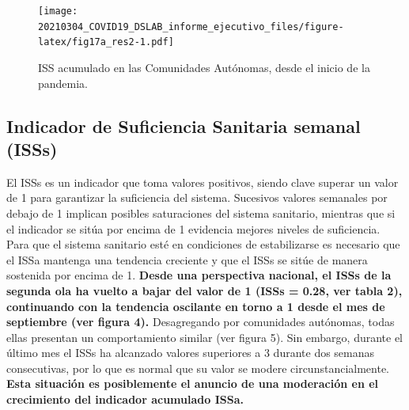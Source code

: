 \documentclass[
  11pt,
]{article}
\begin{document}
\vspace{0.2cm}

\begin{figure}
\centering
\texttt{[image: 20210304\_COVID19\_DSLAB\_informe\_ejecutivo\_files/figure-latex/fig17a\_res2-1.pdf]}
\caption{\label{fig:fig17a_res} ISS acumulado en las Comunidades
Autónomas, desde el inicio de la pandemia.}
\end{figure}

\newpage
\setcounter{page}{6}

\hypertarget{indicador-de-suficiencia-sanitaria-semanal-isss}{%
\subsection{Indicador de Suficiencia Sanitaria semanal
(ISSs)}\label{indicador-de-suficiencia-sanitaria-semanal-isss}}

El ISSs es un indicador que toma valores positivos, siendo clave superar
un valor de 1 para garantizar la suficiencia del sistema. Sucesivos
valores semanales por debajo de 1 implican posibles saturaciones del
sistema sanitario, mientras que si el indicador se sitúa por encima de 1
evidencia mejores niveles de suficiencia. Para que el sistema sanitario
esté en condiciones de estabilizarse es necesario que el ISSa mantenga
una tendencia creciente y que el ISSs se sitúe de manera sostenida por
encima de 1. \textbf{Desde una perspectiva nacional, el ISSs de la
segunda ola ha vuelto a bajar del valor de 1 (ISSs = 0.28, ver tabla 2),
continuando con la tendencia oscilante en torno a 1 desde el mes de
septiembre (ver figura 4).} Desagregando por comunidades autónomas,
todas ellas presentan un comportamiento similar (ver figura 5). Sin
embargo, durante el último mes el ISSs ha alcanzado valores superiores a
3 durante dos semanas consecutivas, por lo que es normal que su valor se
modere circunstancialmente. \textbf{Esta situación es posiblemente el
anuncio de una moderación en el crecimiento del indicador acumulado
ISSa.}
\end{document}
